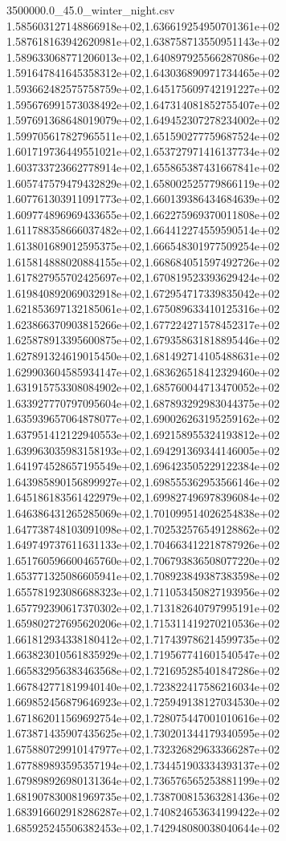 \begin{filecontents*}{3500000.0_45.0_winter_night.csv}
1.585603127148866918e+02,1.636619254950701361e+02
1.587618163942620981e+02,1.638758713550951143e+02
1.589633068771206013e+02,1.640897925566287086e+02
1.591647841645358312e+02,1.643036890971734465e+02
1.593662482575758759e+02,1.645175609742191227e+02
1.595676991573038492e+02,1.647314081852755407e+02
1.597691368648019079e+02,1.649452307278234002e+02
1.599705617827965511e+02,1.651590277759687524e+02
1.601719736449551021e+02,1.653727971416137734e+02
1.603733723662778914e+02,1.655865387431667841e+02
1.605747579479432829e+02,1.658002525779866119e+02
1.607761303911091773e+02,1.660139386434684639e+02
1.609774896969433655e+02,1.662275969370011808e+02
1.611788358666037482e+02,1.664412274559590514e+02
1.613801689012595375e+02,1.666548301977509254e+02
1.615814888020884155e+02,1.668684051597492726e+02
1.617827955702425697e+02,1.670819523393629424e+02
1.619840892069032918e+02,1.672954717339835042e+02
1.621853697132185061e+02,1.675089633410125316e+02
1.623866370903815266e+02,1.677224271578452317e+02
1.625878913395600875e+02,1.679358631818895446e+02
1.627891324619015450e+02,1.681492714105488631e+02
1.629903604585934147e+02,1.683626518412329460e+02
1.631915753308084902e+02,1.685760044713470052e+02
1.633927770797095604e+02,1.687893292983044375e+02
1.635939657064878077e+02,1.690026263195259162e+02
1.637951412122940553e+02,1.692158955324193812e+02
1.639963035983158193e+02,1.694291369344146005e+02
1.641974528657195549e+02,1.696423505229122384e+02
1.643985890156899927e+02,1.698555362953566146e+02
1.645186183561422979e+02,1.699827496978396084e+02
1.646386431265285069e+02,1.701099514026254838e+02
1.647738748103091098e+02,1.702532576549128862e+02
1.649749737611631133e+02,1.704663412218787926e+02
1.651760596600465760e+02,1.706793836508077220e+02
1.653771325086605941e+02,1.708923849387383598e+02
1.655781923086688323e+02,1.711053450827193956e+02
1.657792390617370302e+02,1.713182640797995191e+02
1.659802727695620206e+02,1.715311419270210536e+02
1.661812934338180412e+02,1.717439786214599735e+02
1.663823010561835929e+02,1.719567741601540547e+02
1.665832956383463568e+02,1.721695285401847286e+02
1.667842771819940140e+02,1.723822417586216034e+02
1.669852456879646923e+02,1.725949138127034530e+02
1.671862011569692754e+02,1.728075447001010616e+02
1.673871435907435625e+02,1.730201344179340595e+02
1.675880729910147977e+02,1.732326829633366287e+02
1.677889893595357194e+02,1.734451903334393137e+02
1.679898926980131364e+02,1.736576565253881199e+02
1.681907830081969735e+02,1.738700815363281436e+02
1.683916602918286287e+02,1.740824653634199422e+02
1.685925245506382453e+02,1.742948080038040644e+02

\end{filecontents*}
